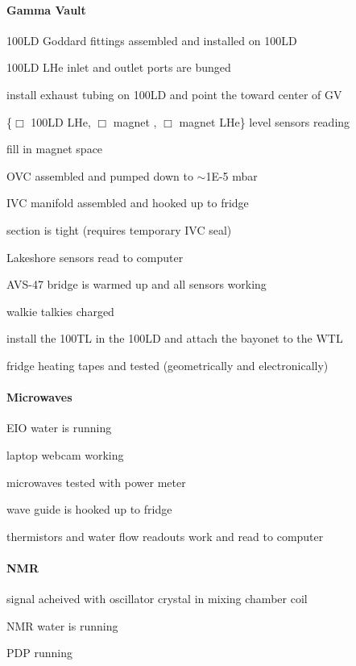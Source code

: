 \begin{appendices}
\paragraph{Gamma Vault}
\begin{checklist}
 \item 100LD Goddard fittings assembled and installed on 100LD
 \item 100LD LHe inlet and outlet ports are bunged
 \item install exhaust tubing on 100LD and point the toward center of GV
 \item \{$\Box$ 100LD LHe, $\Box$ magnet \lnn, $\Box$ magnet LHe\} level sensors reading
 \item fill \lnn{} in magnet space
 \item OVC assembled and pumped down to $\sim$1E-5 mbar %
 \item IVC manifold assembled and hooked up to fridge
 \item \het{} section is tight (requires temporary IVC seal)
 \item Lakeshore sensors read to computer
 \item AVS-47 bridge is warmed up and all sensors working
 \item walkie talkies charged
 \item install the 100TL in the 100LD and attach the bayonet to the WTL
 \item fridge heating tapes and tested (geometrically and electronically)
\end{checklist}

\paragraph{Microwaves}
\begin{checklist}
 \item EIO water is running
 \item laptop webcam working
 \item microwaves tested with power meter
 \item wave guide is hooked up to fridge
 \item thermistors and water flow readouts work and read to computer
\end{checklist}

\paragraph{NMR}
\begin{checklist}
 \item signal acheived with oscillator crystal in mixing chamber coil
 \item NMR water is running
 \item PDP running
\end{checklist}



\end{appendices}
